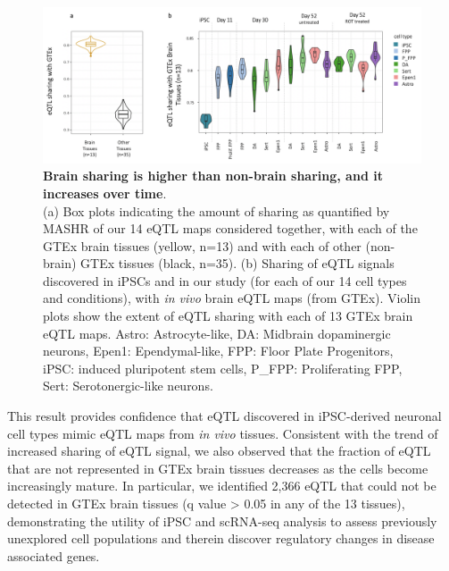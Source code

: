 \begin{figure}[h]
\centering
\includegraphics[width=16cm]{Chapter5/Fig/neuroseq_mashr.png}
\caption[GTEx sharing]{\textbf{Brain sharing is higher than non-brain sharing, and it increases over time}.\\
(a) Box plots indicating the amount of sharing as quantified by MASHR \cite{urbut2019flexible} of our 14 eQTL maps considered together, with each of the GTEx brain tissues (yellow, n=13) and with each of other (non-brain) GTEx tissues (black, n=35).
(b) Sharing of eQTL signals discovered in iPSCs and in our study (for each of our 14 cell types and conditions), 
with \textit{in vivo} brain eQTL maps (from GTEx). 
Violin plots show the extent of eQTL sharing with each of 13 GTEx brain eQTL maps.
Astro: Astrocyte-like, DA: Midbrain dopaminergic neurons, Epen1: Ependymal-like, FPP: Floor Plate Progenitors, iPSC: induced pluripotent stem cells, P\_FPP: Proliferating FPP, Sert: Serotonergic-like neurons.
}
\label{fig:neuroseq_and_gtex_brain_sharing}
\end{figure}

This result provides confidence that eQTL discovered in iPSC-derived neuronal cell types mimic eQTL maps from \textit{in vivo} tissues. 
Consistent with the trend of increased sharing of eQTL signal, we also observed that the fraction of eQTL that are not represented in GTEx brain tissues decreases as the cells become increasingly mature. 
In particular, we identified 2,366 eQTL that could not be detected in GTEx brain tissues (q value > 0.05 in any of the 13 tissues), demonstrating the utility of iPSC and scRNA-seq analysis to assess previously unexplored cell populations and therein discover regulatory changes in disease associated genes. \\

